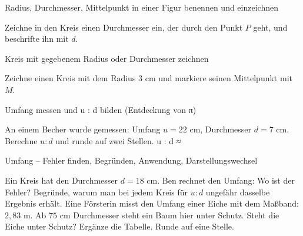 \begin{aufgabe}{Radius, Durchmesser, Mittelpunkt in einer Figur benennen und einzeichnen}
\begin{teile}
\teil Zeichne in den Kreis einen Durchmesser ein, der durch den Punkt $P$ geht, und beschrifte ihn mit $d$.

\begin{kreis}[2]   \end{kreis}
\end{teile}
\end{aufgabe}

\begin{aufgabe}{Kreis mit gegebenem Radius oder Durchmesser zeichnen}
\begin{teile}
\teil Zeichne einen Kreis mit dem Radius $3$ cm und markiere seinen Mittelpunkt mit $M$.

\end{teile}
\end{aufgabe}

\begin{aufgabe}{Umfang messen und u : d bilden (Entdeckung von π)}
\begin{teile}
\teil An einem Becher wurde gemessen: Umfang $u = 22$ cm, Durchmesser $d = 7$ cm. Berechne $u : d$ und runde auf zwei Stellen. u : d ≈ \leerfeld
\end{teile}
\end{aufgabe}

\begin{aufgabe}{Umfang – Fehler finden, Begründen, Anwendung, Darstellungswechsel}
\begin{teile}
\teil Ein Kreis hat den Durchmesser $d = 18$ cm. Ben rechnet den Umfang:  Wo ist der Fehler?
\teil Begründe, warum man bei jedem Kreis für $u : d$ ungefähr dasselbe Ergebnis erhält.
\teil Eine Försterin misst den Umfang einer Eiche mit dem Maßband: $2{,}83$ m. Ab $75$ cm Durchmesser steht ein Baum hier unter Schutz. Steht die Eiche unter Schutz?
\teil Ergänze die Tabelle. Runde auf eine Stelle.

\end{teile}
\end{aufgabe}
